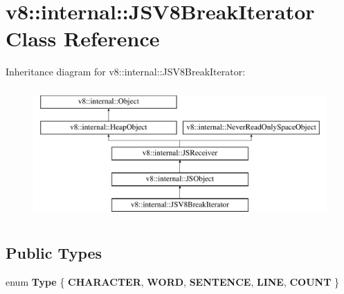 \hypertarget{classv8_1_1internal_1_1JSV8BreakIterator}{}\section{v8\+:\+:internal\+:\+:J\+S\+V8\+Break\+Iterator Class Reference}
\label{classv8_1_1internal_1_1JSV8BreakIterator}
Inheritance diagram for v8\+:\+:internal\+:\+:J\+S\+V8\+Break\+Iterator\+:\begin{figure}[H]
\begin{center}
\leavevmode
\includegraphics[height=5.000000cm]{classv8_1_1internal_1_1JSV8BreakIterator}
\end{center}
\end{figure}
\subsection*{Public Types}
\begin{DoxyCompactItemize}
\item 
\mbox{\label{classv8_1_1internal_1_1JSV8BreakIterator_a7494c1332f57e3a6c2cf5a1b74871605}} 
enum {\bfseries Type} \{ \newline
{\bfseries C\+H\+A\+R\+A\+C\+T\+ER}, 
{\bfseries W\+O\+RD}, 
{\bfseries S\+E\+N\+T\+E\+N\+CE}, 
{\bfseries L\+I\+NE}, 
\newline
{\bfseries C\+O\+U\+NT}
 \}
\end{DoxyCompactItemize}
